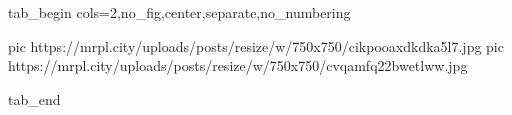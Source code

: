  
 
 
 
 


\ifcmt
  tab_begin cols=2,no_fig,center,separate,no_numbering

     pic https://mrpl.city/uploads/posts/resize/w/750x750/cikpooaxdkdka5l7.jpg
		 pic https://mrpl.city/uploads/posts/resize/w/750x750/cvqamfq22bwetlww.jpg

  tab_end
\fi
